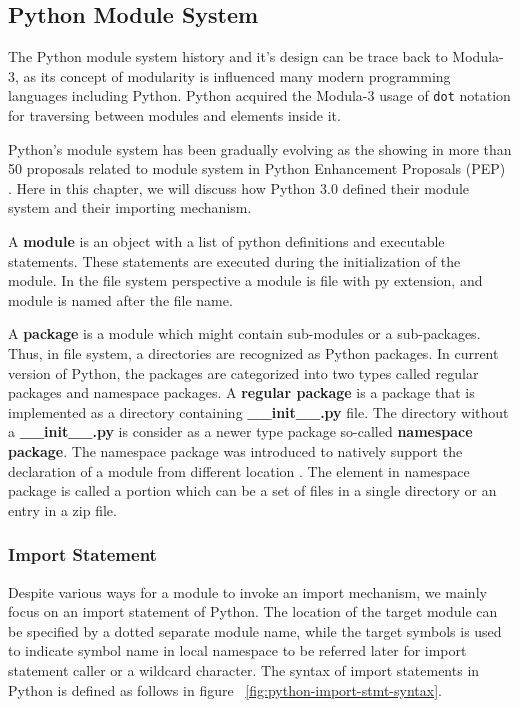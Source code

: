 


\subsection{Python Module System}

The Python module system history and it's design can be trace back to Modula-3, as its concept of modularity is influenced many modern programming languages including Python.
Python acquired the Modula-3\cite{modula-3} usage of \texttt{dot} notation for traversing between modules and elements inside it\cite{python-foreward-essay}.

Python’s module system has been gradually evolving as the showing in more than 50 proposals related to module system in Python Enhancement Proposals (PEP) \cite{pep0}. Here in this chapter, we will discuss how Python 3.0 defined their module system and their importing mechanism.

A \textbf{module} is an object with a list of python definitions and executable statements. These statements are executed during the initialization of the module. In the file system perspective a module is file with py extension, and module is named after the file name.

A \textbf{package} is a module which might contain sub-modules or a sub-packages.
Thus, in file system, a directories are recognized as Python packages.
In current version of Python, the packages are categorized into two types called regular packages and namespace packages.
A \textbf{regular package} is a package that is implemented as a directory containing \textbf{\_\_init\_\_.py} file.
The directory without a \textbf{\_\_init\_\_.py} is consider as a newer type package so-called \textbf{namespace package}.
The namespace package was introduced to natively support the declaration of a module from different location \cite{pep420}. The element in namespace package is called a portion which can be a set of files in a single directory or an entry in a zip file.

\subsubsection{Import Statement}

Despite various ways for a module to invoke an import mechanism, we mainly focus on an import statement of Python.
The location of the target module can be specified by a dotted separate module name, while the target symbols is used to indicate symbol name in local namespace to be referred later for import statement caller or a wildcard character.
The syntax of import statements in Python is defined as follows in figure ~\ref{fig:python-import-stmt-syntax}.

